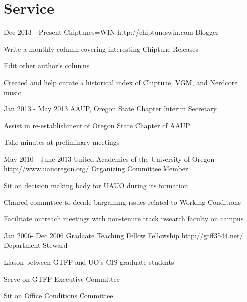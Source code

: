 \documentclass[10pt]{article} %
\begin{document}
\section{Service}

\job
{Dec 2013 - }{Present}
{Chiptunes=WIN}
{http://chiptuneswin.com}
{Blogger}
{

\begin{itemize-noindent}
\setlength\itemsep{0.12em}
\item{Write a monthly column covering interesting Chiptune Releases}
\item{Edit other author's columns}
\item{Created and help curate a historical index of Chiptune, VGM, and Nerdcore music}
\end{itemize-noindent}

}

\job
{Jan 2013 - }{May 2013}
{AAUP, Oregon State Chapter}
{}
{Interim Secretary}
{

\begin{itemize-noindent}
\setlength\itemsep{0.12em}
\item{Assist in re-establishment of Oregon State Chapter of AAUP}
\item{Take minutes at preliminary meetings}
\end{itemize-noindent}

}

\job
{May 2010 - }{June 2013}
{United Academics of the University of Oregon}
{http://www.uauoregon.org/}
{Organizing Committee Member}
{
\begin{itemize-noindent}
\setlength\itemsep{0.12em}
\item{Sit on decision making body for UAUO during its formation}
\item{Chaired committee to decide bargaining issues related to Working Conditions}
\item{Facilitate outreach meetings with non-tenure track research faculty on campus}
\end{itemize-noindent}
}

\job
{Jan 2006- }{Dec 2006}
{Graduate Teaching Fellow Fellowship}
{http://gtff3544.net/}
{Department Steward}
{
\begin{itemize-noindent}
\setlength\itemsep{0.12em}
\item{Liason between GTFF and UO's CIS graduate students}
\item{Serve on GTFF Executive Committee}
\item{Sit on Office Conditions Committee}
\end{itemize-noindent}
}
\end{document}
